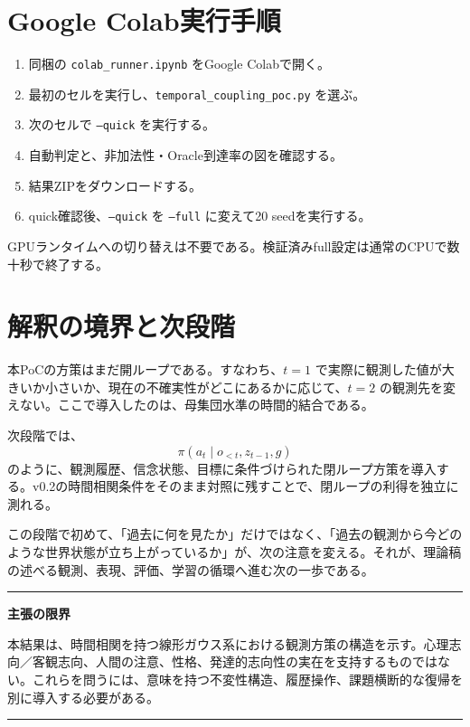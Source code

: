 \documentclass[11pt,a4paper]{ltjsarticle}
\newcommand{\code}[1]{\texttt{#1}}
\newenvironment{warningbox}{\begin{center}\begin{minipage}{0.92\linewidth}\color{Accent}\hrule\vspace{6pt}\color{black}}{\vspace{6pt}\color{Accent}\hrule\color{black}\end{minipage}\end{center}}
\begin{document}
\section{Google Colab実行手順}

\begin{enumerate}
\item 同梱の \code{colab\_runner.ipynb} をGoogle Colabで開く。
\item 最初のセルを実行し、\code{temporal\_coupling\_poc.py} を選ぶ。
\item 次のセルで \code{--quick} を実行する。
\item 自動判定と、非加法性・Oracle到達率の図を確認する。
\item 結果ZIPをダウンロードする。
\item quick確認後、\code{--quick} を \code{--full} に変えて20 seedを実行する。
\end{enumerate}

GPUランタイムへの切り替えは不要である。検証済みfull設定は通常のCPUで数十秒で終了する。

\section{解釈の境界と次段階}

本PoCの方策はまだ開ループである。すなわち、$t=1$ で実際に観測した値が大きいか小さいか、現在の不確実性がどこにあるかに応じて、$t=2$ の観測先を変えない。ここで導入したのは、母集団水準の時間的結合である。

次段階では、
\begin{equation}
\pi(a_t\mid o_{<t},z_{t-1},g)
\end{equation}
のように、観測履歴、信念状態、目標に条件づけられた閉ループ方策を導入する。v0.2の時間相関条件をそのまま対照に残すことで、閉ループの利得を独立に測れる。

この段階で初めて、「過去に何を見たか」だけではなく、「過去の観測から今どのような世界状態が立ち上がっているか」が、次の注意を変える。それが、理論稿の述べる観測、表現、評価、学習の循環へ進む次の一歩である。

\begin{warningbox}
\textbf{主張の限界}

本結果は、時間相関を持つ線形ガウス系における観測方策の構造を示す。心理志向／客観志向、人間の注意、性格、発達的志向性の実在を支持するものではない。これらを問うには、意味を持つ不変性構造、履歴操作、課題横断的な復帰を別に導入する必要がある。
\end{warningbox}
\end{document}
